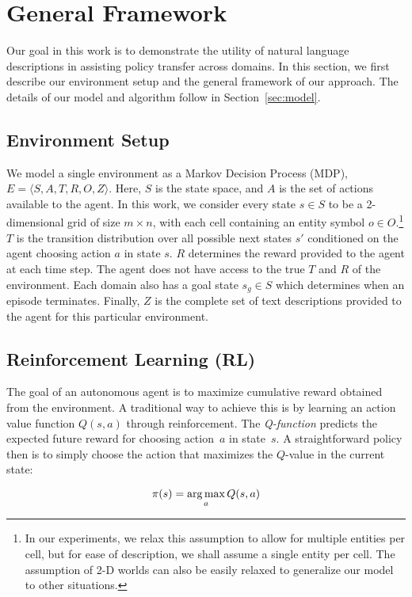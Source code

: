 \section{General Framework}
\label{sec:framework}
Our goal in this work is to demonstrate the utility of natural language descriptions in assisting policy transfer across domains. In this section, we first describe our environment setup and the general framework of our approach. The details of our model and algorithm follow in Section~\ref{sec:model}.

\subsection{Environment Setup} 
We model a single environment as a Markov Decision Process (MDP),  $E = \langle S, A, T, R, O, Z \rangle$. Here, $S$ is the state space, and $A$ is the set of actions available to the agent. In this work, we consider every state $s \in S$ to be a 2-dimensional grid of size $m \times n$, with each cell containing an entity symbol $o \in O$.\footnote{In our experiments, we relax this assumption to allow for multiple entities per cell, but for ease of description, we shall assume a single entity per cell. The assumption of 2-D worlds can also be easily relaxed to generalize our model to other situations.} $T$ is the transition distribution over all possible next states $s'$ conditioned on the agent choosing action $a$ in state $s$. $R$ determines the reward provided to the agent at each time step. The agent does not have access to the true $T$ and $R$ of the environment. Each domain also has a goal state $s_g \in S$ which determines when an episode terminates. Finally, $Z$ is the complete set of text descriptions provided to the agent for this particular environment. 

\subsection{Reinforcement Learning (RL)}
The goal of an autonomous agent is to maximize cumulative reward obtained from the environment. A traditional way to achieve this is by learning an action value function $Q(s,a)$ through reinforcement. The \emph{Q-function} predicts the expected future reward for choosing action~$a$ in state~$s$. A straightforward policy then is to simply choose the action that maximizes the $Q$-value in the current state: 

\begin{dmath*}
\pi(s) = \argmax_a Q(s,a)
\end{dmath*}

